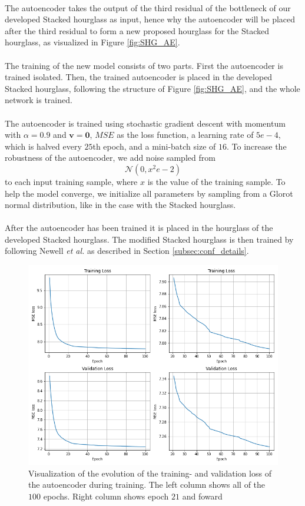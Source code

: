 \documentclass[./main.tex]{subfiles}
\begin{document}
\\
The autoencoder takes the output of the third residual of the bottleneck of our developed Stacked hourglass as input, hence why the autoencoder will be placed after the third residual to form a new proposed hourglass for the Stacked hourglass, as visualized in Figure \ref{fig:SHG_AE}.
\\
\\
The training of the new model consists of two parts. First the autoencoder is trained isolated. Then, the trained autoencoder is placed in the developed Stacked hourglass, following the structure of Figure \ref{fig:SHG_AE}, and the whole network is trained.
\\
\\
The autoencoder is trained using stochastic gradient descent with momentum with $\alpha = 0.9$ and $\bm{v} = \bm{0}$, $MSE$ as the loss function, a learning rate of $5e-4$, which is halved every $25$th epoch, and a mini-batch size of $16$. To increase the robustness of the autoencoder, we add noise sampled from
$$\mathcal{N} \left(0, x^2e-2 \right)$$
to each input training sample, where $x$ is the value of the training sample. To help the model converge, we initialize all parameters by sampling from a Glorot normal distribution, like in the case with the Stacked hourglass.
\\
\\
After the autoencoder has been trained it is placed in the hourglass of the developed Stacked hourglass. The modified Stacked hourglass is then trained by following Newell \textit{et al.} \cite{Newell} as described in Section \ref{subsec:conf_details}.
\begin{figure}[htbp]
    \centering
    \includegraphics[height = 8 cm]{entities/AE_evolution.png}
    \caption{Visualization of the evolution of the training- and validation loss of the autoencoder during training. The left column shows all of the $100$ epochs. Right column shows epoch $21$ and foward}
    \label{fig:AE_evolution}
\end{figure}
\end{document}
